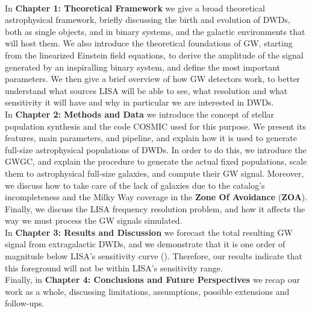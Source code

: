 \vspace{2mm}
\\  
In \textbf{Chapter 1: Theoretical Framework} we give a broad theoretical astrophysical framework, briefly discussing the birth and evolution of DWDs, both as single objects, and in binary systems, and the galactic environments that will host them.
We also introduce the theoretical foundations of GW, starting from the linearized Einstein field equations, to derive the amplitude of the signal generated by an inspiralling binary system, and define the most important parameters.
We then give a brief overview of how GW detectors work, to better understand what sources LISA will be able to see, what resolution and what sensitivity it will have and why in particular we are interested in DWDs.
\vspace{2mm}\\
In \textbf{Chapter 2: Methods and Data} we introduce the concept of stellar population synthesis and the code COSMIC used for this purpose.
We present its features, main parameters, and pipeline, and explain how it is used to generate full-size astrophysical populations of DWDs.
In order to do this, we introduce the GWGC, and explain the procedure to generate the actual fixed populations, scale them to astrophysical full-size galaxies, and compute their GW signal. 
Moreover, we discuss how to take care of the lack of galaxies due to the catalog's incompleteness and the Milky Way coverage in the \textbf{Zone Of Avoidance} (\textbf{ZOA}).
Finally, we discuss the LISA frequency resolution problem, and how it affects the way we must process the GW signals simulated.\vspace{2mm}\\
In \textbf{Chapter 3: Results and Discussion} {we forecast the total resulting GW signal from extragalactic DWDs, and we demonstrate that it is one order of magnitude below LISA's sensitivity curve (\cite{Robson_2019})}.
Therefore, our results indicate that this foreground will not be within LISA's sensitivity range.\vspace{2mm}\\
Finally, in \textbf{Chapter 4: Conclusions and Future Perspectives} we recap our work as a whole, discussing limitations, assumptions, possible extensions and follow-ups.
